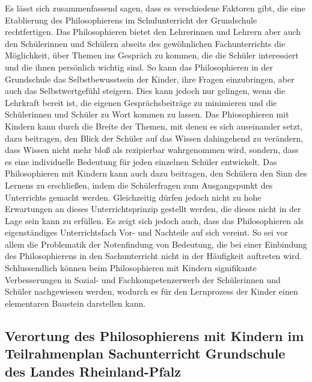 Es lässt sich zusammenfassend sagen, dass es verschiedene Faktoren gibt, die eine Etablierung des Philosophierens im Schulunterricht der Grundschule rechtfertigen. 
Das Philosophieren bietet den Lehrerinnen und Lehrern aber auch den Schülerinnen und Schülern abseits des gewöhnlichen Fachunterrichts die Möglichkeit, über Themen ins Gespräch zu kommen, die die Schüler interessiert und die ihnen persönlich wichtig sind. 
So kann das Philosophieren in der Grundschule das Selbstbewusstsein der Kinder, ihre Fragen einzubringen, aber auch das Selbstwertgefühl steigern. 
Dies kann jedoch nur gelingen, wenn die Lehrkraft bereit ist, die eigenen Gesprächsbeiträge zu minimieren und die Schülerinnen und Schüler zu Wort kommen zu lassen.
Das Phiosophieren mit Kindern kann durch die Breite der Themen, mit denen es sich auseinander setzt, dazu beitragen, den Blick der Schüler auf das Wissen dahingehend zu verändern, dass Wissen nicht mehr bloß als rezipierbar wahrgenommen wird, sondern, dass es eine individuelle Bedeutung für jeden einzelnen Schüler entwickelt.
Das Philosophieren mit Kindern kann auch dazu beitragen, den Schülern den Sinn des Lernens zu erschließen, indem die Schülerfragen zum Ausgangspunkt des Unterrichts gemacht werden.
Gleichzeitig dürfen jedoch nicht zu hohe Erwartungen an dieses Unterrichtsprinzip gestellt werden, die dieses nicht in der Lage sein kann zu erfüllen. 
Es zeigt sich jedoch auch, dass das Philosophieren als eigenständiges Unterrichtsfach Vor- und Nachteile auf sich vereint.
So sei vor allem die Problematik der Notenfindung von Bedeutung, die bei einer Einbindung des Philosophierens in den Sachunterricht nicht in der Häufigkeit auftreten wird.
Schlussendlich können beim Philosophieren mit Kindern signifikante Verbesserungen in Sozial- und Fachkompetenzerwerb der Schülerinnen und Schüler nachgewiesen werden, wodurch es für den Lernprozess der Kinder einen elementaren Baustein darstellen kann.

\newpage
\subsection{Verortung des Philosophierens mit Kindern im Teilrahmenplan Sachunterricht Grundschule des Landes Rheinland-Pfalz}

